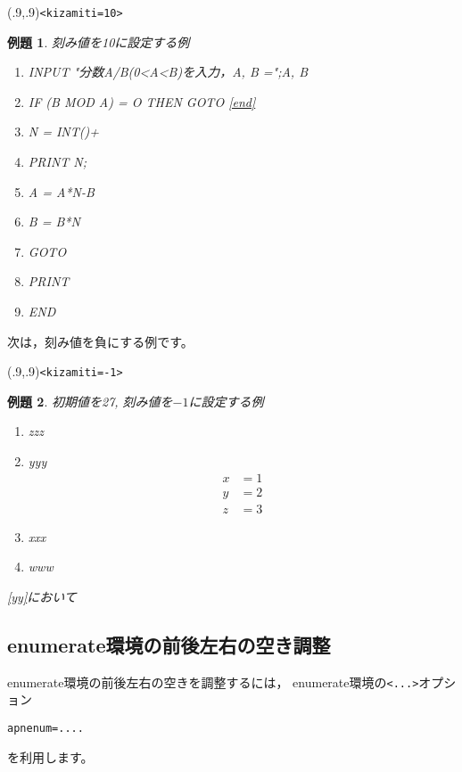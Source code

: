\documentclass[fleqn,a4j]{jarticle}
\newtheorem{reidai}{例題}
\begin{document}
\begin{showEx}(.9,.9){\texttt{<kizamiti=10>}}
\begin{reidai}
  刻み値を10に設定する例
  \begin{jquote}
    \begin{ttfamily}
    \begin{enumerate}<syokiti=90,kizamiti=10>[1]
      \item INPUT "分数A/B(0<A<B)を入力，A, B =";A, B
      \item IF (B MOD A) = O THEN GOTO \ref{end}
      \item N = INT(\Hako)+\Hako
      \item PRINT N;
      \item A = A*N-B
      \item B = B*N
      \item GOTO \Hako
      \item \label{end}PRINT \Hako
      \item END
    \end{enumerate}
    \end{ttfamily}
  \end{jquote}
\end{reidai}
\end{showEx}

次は，刻み値を負にする例です。

\begin{showEx}(.9,.9){\texttt{<kizamiti=-1>}}
\begin{reidai}
  初期値を27, 刻み値を$-1$に設定する例
  \begin{jquote}
    \begin{enumerate}<syokiti=27,kizamiti=-1>[1.~]
      \item zzz
      \item yyy
        \begin{align}
          x&=1\\
          y&=2\label{yy}\\
          z&=3
        \end{align}
      \item xxx
      \item www
    \end{enumerate}
    \eqref{yy}において
  \end{jquote}
\end{reidai}
\end{showEx}

\subsection{\textsf{enumerate}環境の前後左右の空き調整}
\textsf{enumerate}環境の前後左右の空きを調整するには，
\textsf{enumerate}環境の\verb+<...>+オプション
\begin{jquote}
\begin{verbatim}
apnenum=....
\end{verbatim}
\end{jquote}
を利用します。
\end{document}
